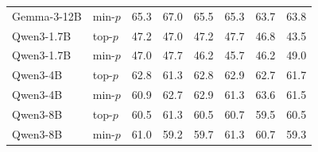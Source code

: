 \begin{tabular}{llcccccc}
Gemma-3-12B & min-$p$ & 65.3 & 67.0 & 65.5 & 65.3 & 63.7 & 63.8 \\
Qwen3-1.7B & top-$p$ & 47.2 & 47.0 & 47.2 & 47.7 & 46.8 & 43.5 \\
Qwen3-1.7B & min-$p$ & 47.0 & 47.7 & 46.2 & 45.7 & 46.2 & 49.0 \\
Qwen3-4B & top-$p$ & 62.8 & 61.3 & 62.8 & 62.9 & 62.7 & 61.7 \\
Qwen3-4B & min-$p$ & 60.9 & 62.7 & 62.9 & 61.3 & 63.6 & 61.5 \\
Qwen3-8B & top-$p$ & 60.5 & 61.3 & 60.5 & 60.7 & 59.5 & 60.5 \\
Qwen3-8B & min-$p$ & 61.0 & 59.2 & 59.7 & 61.3 & 60.7 & 59.3 \\
\bottomrule
\end{tabular}
